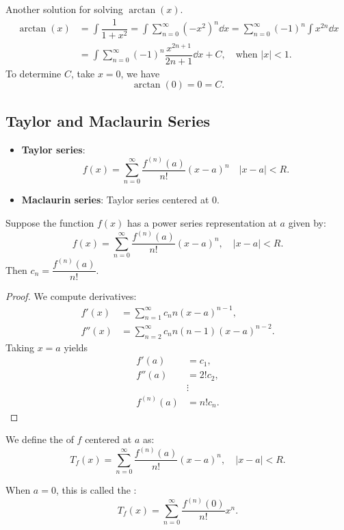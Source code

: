 \begin{ex}
Another solution for solving $\arctan(x)$.
\begin{align*}
    \arctan(x) &= \int \dfrac{1}{1+x^2} 
    = \int \sum_{n=0}^{\infty} (-x^2)^n \dd x = \sum_{n=0}^{\infty} (-1)^n \int x^{2n} \dd x\\
    &= \int \sum_{n=0}^{\infty} (-1)^n \dfrac{x^{2n+1}}{2n+1}\dd x + C, \quad \text{when } |x| < 1.
\end{align*}
To determine $C$, take $x = 0$, we have
\[\arctan(0) = 0 = C.\]
\end{ex}

\subsection{Taylor and Maclaurin Series} 
\begin{center}
\begin{tcolorbox}
    \begin{itemize}
        \item \textbf{Taylor series}: 
        \[f(x) = \sum_{n=0}^{\infty} \dfrac{f^{(n)}(a)}{n!}(x-a)^n \quad |x-a| < R. \]
        \item \textbf{Maclaurin series}: Taylor series centered at 0.
    \end{itemize}
\end{tcolorbox}
\end{center}
\begin{thm}
    Suppose the function $f(x)$ has a power series representation at $a$ given by:
    \[f(x) = \sum_{n=0}^{\infty} \dfrac{f^{(n)}(a)}{n!}(x-a)^n, \quad |x-a| < R.\]
    Then $c_n = \dfrac{f^{(n)}(a)}{n!}$.
\end{thm}

\begin{proof}
    We compute derivatives:
    \begin{align*}
        f'(x) &= \sum_{n=1}^{\infty} c_n n (x-a)^{n-1}, \\
        f''(x) &= \sum_{n=2}^{\infty} c_n n (n-1) (x-a)^{n-2}.
    \end{align*}
    Taking $x = a$ yields
    \begin{align*}
        f'(a) &= c_1, \tag{$C_1$ is the only non-vanishing term}\\
        f''(a) &= 2!c_2,\\
        &\vdots\\
        f^{(n)}(a) &= n!c_n.
    \end{align*}
\end{proof}
\begin{defn}
    We define the  of $f$ centered at $a$ as:
    \[T_f(x) = \sum_{n=0}^{\infty} \dfrac{f^{(n)}(a)}{n!}(x-a)^n, \quad |x-a| < R.\]

    When $a=0$, this is called the :
    \[T_f(x) = \sum_{n=0}^{\infty} \dfrac{f^{(n)}(0)}{n!}x^n.\]
\end{defn}

